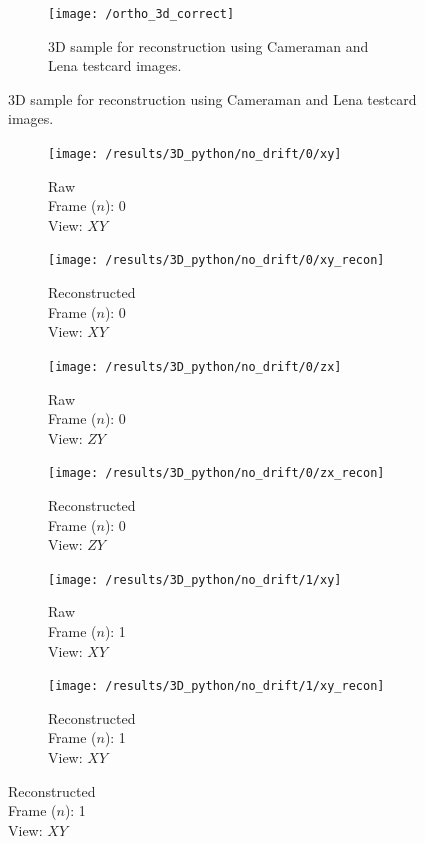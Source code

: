 \begin{figure}
    \begin{subfigure}[t]{\linewidth}
        \centering
        \texttt{[image: /ortho\_3d\_correct]}
        \caption{\gls{3D} sample for reconstruction using Cameraman and Lena testcard images.}
        \label{fig:ortho_3d_correct}
    \end{subfigure}
\end{figure}
\begin{figure}
\ContinuedFloat
    \begin{subfigure}[t]{0.2\linewidth}
        \centering
        \texttt{[image: /results/3D\_python/no\_drift/0/xy]}\caption{Raw\\Frame (\(n\)): 0\\View: \(XY\)}
    \end{subfigure}\hfill
    \begin{subfigure}[t]{0.2\linewidth}
        \centering
        \texttt{[image: /results/3D\_python/no\_drift/0/xy\_recon]}\caption{Reconstructed\\Frame (\(n\)): 0\\View: \(XY\)}
    \end{subfigure}\hfill
    \begin{subfigure}[t]{0.2\linewidth}
        \centering
        \texttt{[image: /results/3D\_python/no\_drift/0/zx]}\caption{Raw\\Frame (\(n\)): 0\\View: \(ZY\)}
    \end{subfigure}\hfill
    \begin{subfigure}[t]{0.2\linewidth}
        \centering
        \texttt{[image: /results/3D\_python/no\_drift/0/zx\_recon]}\caption{Reconstructed\\Frame (\(n\)): 0\\View: \(ZY\)}
    \end{subfigure}
    \begin{subfigure}[t]{0.2\linewidth}
        \centering
        \texttt{[image: /results/3D\_python/no\_drift/1/xy]}\caption{Raw\\Frame (\(n\)): 1\\View: \(XY\)}
    \end{subfigure}\hfill
    \begin{subfigure}[t]{0.2\linewidth}
        \centering
        \texttt{[image: /results/3D\_python/no\_drift/1/xy\_recon]}\caption{Reconstructed\\Frame (\(n\)): 1\\View: \(XY\)}
    \end{subfigure}\hfill

\end{figure}
